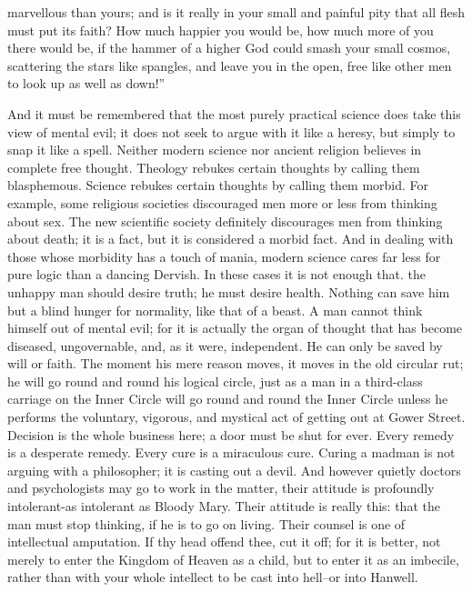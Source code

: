 \documentclass{book}
\begin{document}
marvellous than yours; and is it really in your small and painful pity that all flesh must put its faith? How much happier you would be, how much more of you there would be, if the hammer of a higher God could smash your small cosmos, scattering the stars like spangles, and leave you in the open, free like other men to look up as well as down!”

And it must be remembered that the most purely practical science does take this view of mental evil; it does not seek to argue with it like a heresy, but simply to snap it like a spell. Neither modern science nor ancient religion believes in complete free thought. Theology rebukes certain thoughts by calling them blasphemous. Science rebukes certain thoughts by calling them morbid. For example, some religious societies discouraged men more or less from thinking about sex. The new scientific society definitely discourages men from thinking about death; it is a fact, but it is considered a morbid fact. And in dealing with those whose morbidity has a touch of mania, modern science cares far less for pure logic than a dancing Dervish. In these cases it is not enough that. the unhappy man should desire truth; he must desire health. Nothing can save him but a blind hunger for normality, like that of a beast. A man cannot think himself out of mental evil; for it is actually the organ of thought that has become diseased, ungovernable, and, as it were, independent. He can only be saved by will or faith. The moment his mere reason moves, it moves in the old circular rut; he will go round and round his logical circle, just as a man in a third-class carriage on the Inner Circle will go round and round the Inner Circle unless he performs the voluntary, vigorous, and mystical act of getting out at Gower Street. Decision is the whole business here; a door must be shut for ever. Every remedy is a desperate remedy. Every cure is a miraculous cure. Curing a madman is not arguing with a philosopher; it is casting out a devil. And however quietly doctors and psychologists may go to work in the matter, their attitude is profoundly intolerant-as intolerant as Bloody Mary. Their attitude is really this: that the man must stop thinking, if he is to go on living. Their counsel is one of intellectual amputation. If thy head offend thee, cut it off; for it is better, not merely to enter the Kingdom of Heaven as a child, but to enter it as an imbecile, rather than with your whole intellect to be cast into hell–or into Hanwell.
\end{document}
